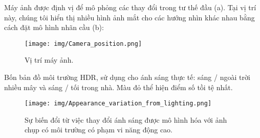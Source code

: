 Máy ảnh được định vị để mô phỏng các thay đổi trong tư thế đầu (a). Tại vị trí này, chúng tôi hiển thị nhiều hình ảnh mắt cho các hướng nhìn khác nhau bằng cách đặt mô hình nhãn cầu (b):
\begin{center}
    \begin{figure}[h!]
    \begin{center}
     \texttt{[image: img/Camera\_position.png]}
    \end{center}
    \caption{Vị trí máy ảnh.}
    \label{refhinh20}
    \end{figure}
\end{center}

Bốn bản đồ môi trường HDR, sử dụng cho ánh sáng thực tế: sáng / ngoài trời nhiều mây và sáng / tối trong nhà. Màu đỏ thể hiện điểm số tồi tệ nhất.

\begin{center}
    \begin{figure}[h!]
    \begin{center}
     \texttt{[image: img/Appearance\_variation\_from\_lighting.png]}
    \end{center}
    \caption{Sự biến đổi từ việc thay đổi ánh sáng được mô hình hóa với ảnh chụp có môi trường có phạm vi năng động cao.}
    \label{refhinh20}
    \end{figure}
\end{center}

